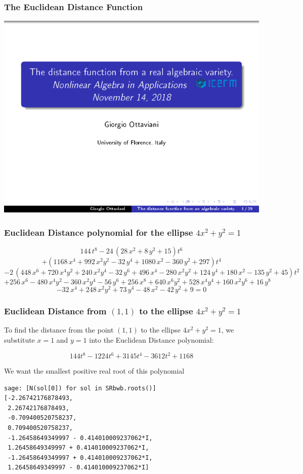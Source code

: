 \documentclass{beamer}
\begin{document}
\begin{frame}
\frametitle{The Euclidean Distance Function}
\includegraphics[page=15, clip, trim=0in 0in 0in 0in, width=\textwidth]{The_distance_function_from_a_real_algebraic_variety_]_Giorgio_Ottaviani,_University_of_Florence.pdf}
\end{frame}

\begin{frame}
\frametitle{Euclidean Distance polynomial for the ellipse $4x^2 + y^2 = 1$}
\scriptsize
\[ 144 \, t^{8} - 24 \, {\left(28 \, x^{2} + 8 \, y^{2} + 15\right)} t^{6} \]
\[ + {\left(1168 \, x^{4} + 992 \, x^{2} y^{2} - 32 \, y^{4} + 1080 \, x^{2} - 360 \, y^{2} + 297\right)} t^{4} \]
\[ - 2 \, {\left(448 \, x^{6} + 720 \, x^{4} y^{2} + 240 \, x^{2} y^{4} - 32 \, y^{6} + 496 \, x^{4} - 280 \, x^{2} y^{2} + 124 \, y^{4} + 180 \, x^{2} - 135 \, y^{2} + 45\right)} t^{2} \]
\[ + 256 \, x^{6} - 480 \, x^{4} y^{2} - 360 \, x^{2} y^{4} - 56 \, y^{6} + 256 \, x^{8} + 640 \, x^{6} y^{2} + 528 \, x^{4} y^{4} + 160 \, x^{2} y^{6} + 16 \, y^{8} \]
\[ - 32 \, x^{4} + 248 \, x^{2} y^{2} + 73 \, y^{4} - 48 \, x^{2} - 42 \, y^{2} + 9 = 0 \]
\end{frame}

\begin{frame}[fragile]
\frametitle{Euclidean Distance from $(1,1)$ to the ellipse $4x^2 + y^2 = 1$}
To find the distance from the point $(1,1)$ to the ellipse $4x^2 + y^2 = 1$, we substitute $x=1$ and $y=1$ into
the Euclidean Distance polynomial:

\[ 144 t^{8} - 1224 t^{6} + 3145 t^{4} - 3612 t^{2} + 1168 \]

We want the smallest positive real root of this polynomial

\begin{verbatim}
sage: [N(sol[0]) for sol in SRbwb.roots()]                                                                                         
[-2.26742176878493,
 2.26742176878493,
 -0.709400520758237,
 0.709400520758237,
 -1.26458649349997 - 0.414010009237062*I,
 1.26458649349997 + 0.414010009237062*I,
 -1.26458649349997 + 0.414010009237062*I,
 1.26458649349997 - 0.414010009237062*I]
\end{verbatim}
\end{frame}
\end{document}
